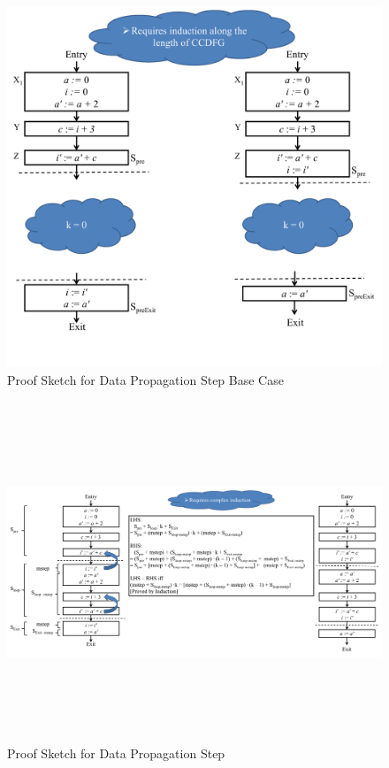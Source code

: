 \begin{enumerate}
\begin{figure}[t!]
\begin{center}
\includegraphics[width=5.5in]{fig-proposal/proof-after-data-propagation-basecase}
\end{center}
\caption{Proof Sketch for Data Propagation Step Base Case}
\label{fig:proof-after-data-propagation-basecase}
\end{figure}

\clearpage
\begin{figure}
\begin{center}
\includegraphics[height=4in]{fig-proposal/proof-after-inductive-step}
\end{center}
\caption{Proof Sketch for Data Propagation Step}
\label{fig:proof-after-inductive-step}
\end{figure}
\clearpage
 

\end{enumerate}
